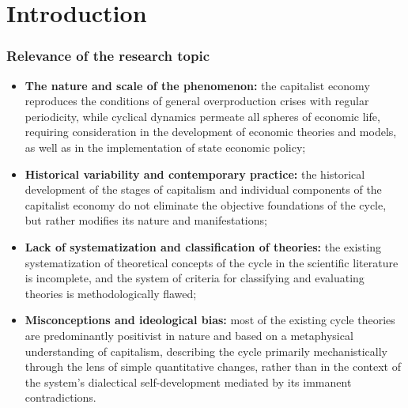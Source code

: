 \section{Introduction}

\begin{frame}
    \frametitle{Relevance of the research topic}
      \begin{itemize}
        \item \textbf{The nature and scale of the phenomenon:} the capitalist economy reproduces the conditions of general overproduction crises with regular periodicity, while cyclical dynamics permeate all spheres of economic life, requiring consideration in the development of economic theories and models, as well as in the implementation of state economic policy;
        \item \textbf{Historical variability and contemporary practice:} the historical development of the stages of capitalism and individual components of the capitalist economy do not eliminate the objective foundations of the cycle, but rather modifies its nature and manifestations;
        \item \textbf{Lack of systematization and classification of theories:} the existing systematization of theoretical concepts of the cycle in the scientific literature is incomplete, and the system of criteria for classifying and evaluating theories is methodologically flawed;
        \item \textbf{Misconceptions and ideological bias:} most of the existing cycle theories are predominantly positivist in nature and based on a metaphysical understanding of capitalism, describing the cycle primarily mechanistically through the lens of simple quantitative changes, rather than in the context of the system's dialectical self-development mediated by its immanent contradictions.
      \end{itemize}
\end{frame}

